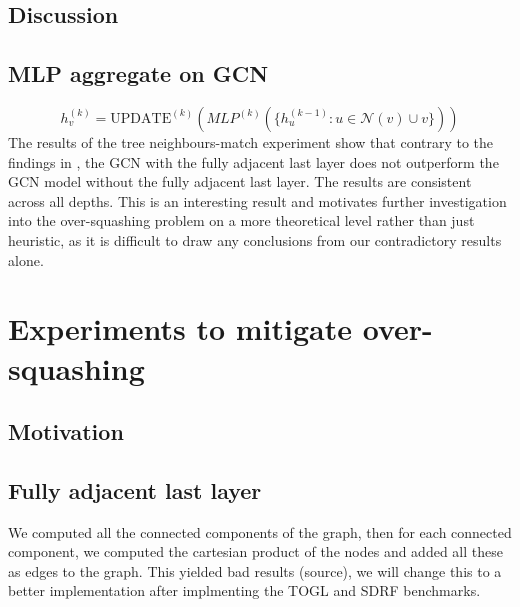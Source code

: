\documentclass[a4paper,12pt]{article}
\begin{document}
\subsection{Discussion}


\subsection{MLP aggregate on GCN}
\[
	h_v^{(k)} = \text{UPDATE}^{(k)} \left(MLP^{(k)}(\{ h_u^{(k-1)}: u \in \mathcal{N}(v) \cup v \}) \right)
\]
The results of the tree neighbours-match experiment show that contrary to the findings in \cite{alon_bottleneck_2021}, the GCN with the fully adjacent last layer does not outperform the GCN model without the fully adjacent last layer. The results are consistent across all depths. This is an interesting result and motivates further investigation into the over-squashing problem on a more theoretical level rather than just heuristic, as it is difficult to draw any conclusions from our contradictory results alone. 


\section{Experiments to mitigate over-squashing}
\subsection{Motivation}

\subsection{Fully adjacent last layer}
We computed all the connected components of the graph, then for each connected component, we computed the cartesian product of the nodes and added all these as edges to the graph.
This yielded bad results (source), we will change this to a better implementation after implmenting the TOGL and SDRF benchmarks.
\end{document}

